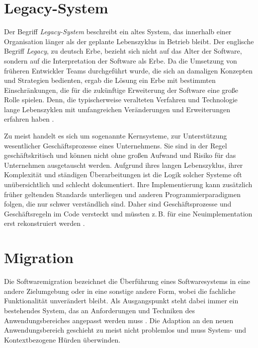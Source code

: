 \section{Legacy-System}

	Der Begriff \textit{Legacy-System} beschreibt ein altes System, das innerhalb einer Organisation länger als der geplante Lebenszyklus in Betrieb bleibt. Der englische Begriff \textit{Legacy}, zu deutsch Erbe, bezieht sich nicht auf das Alter der Software, sondern auf die Interpretation der Software als Erbe. Da die Umsetzung von früheren Entwickler Teams durchgeführt wurde, die sich an damaligen Konzepten und Strategien bedienten, ergab die Lösung ein Erbe mit bestimmten Einschränkungen, die für die zukünftige Erweiterung der Software eine große Rolle spielen. Denn, die typischerweise veralteten Verfahren und Technologie lange Lebenszyklen mit umfangreichen Veränderungen und Erweiterungen erfahren haben \cite{sneed2016softwaremigration}. \bigbreak

	Zu meist handelt es sich um sogenannte Kernsysteme, zur Unterstützung wesentlicher Geschäftsprozesse eines Unternehmens. Sie sind in der Regel geschäftskritisch und können nicht ohne großen Aufwand und Risiko für das Unternehmen ausgetauscht werden. Aufgrund ihres langen Lebenszyklus, ihrer Komplexität und ständigen Überarbeitungen ist die Logik solcher Systeme oft unübersichtlich und schlecht dokumentiert. Ihre Implementierung kann zusätzlich früher geltenden Standards unterliegen und anderen Programmierparadigmen folgen, die nur schwer verständlich sind. Daher sind Geschäftsprozesse und Geschäftsregeln im Code versteckt und müssten z.\,B. für eine Neuimplementation erst rekonstruiert werden \cite{martens2016ablosung}.

\section{Migration} \label{ssub:migration}

	Die Softwaremigration bezeichnet die Überführung eines Softwaresystems in eine andere Zielumgebung oder in eine sonstige andere Form, wobei die fachliche Funktionalität unverändert bleibt. Als Ausgangspunkt steht dabei immer ein bestehendes System, das an Anforderungen und Techniken des Anwendungsbereiches angepasst werden muss \cite{sneed2016softwaremigration}. Die Adaption an den neuen Anwendungsbereich geschieht zu meist nicht problemlos und muss System- und Kontextbezogene Hürden überwinden. 


